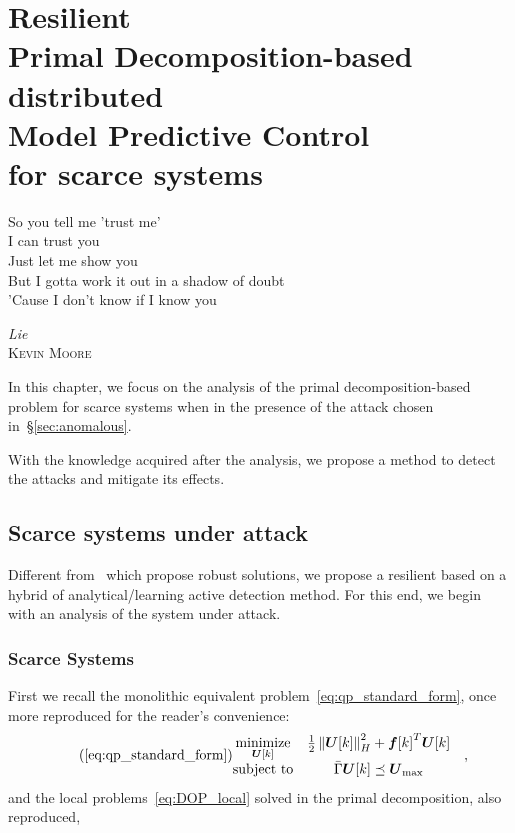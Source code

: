 \documentclass[../main.tex]{subfiles}
\begin{document}
\chapter[Resilient Primal Decomposition-based dMPC for scarce systems]{Resilient \\Primal Decomposition-based \\distributed \\Model Predictive Control\\ for scarce systems}\label{sec:safe_pddmpc_eq}
\epigraph{\centering So you tell me 'trust me' \\I can trust you\\ Just let me show you \\But I gotta work it out in a shadow of doubt \\'Cause I don't know if I know you}
{\textit{Lie}\\\textsc{Kevin Moore}}

In this chapter, we focus on the analysis of the primal decomposition-based \dmpc{} problem for scarce systems when in the presence of the attack chosen in~\S\ref{sec:anomalous}.

With the knowledge acquired after the analysis, we propose a method to detect the attacks and mitigate its effects.

\minitoc


\section{Scarce systems under attack}\label{sec:analys-scarce-syst}

Different from~\cite{VelardeEtAl2018,MaestreEtAl2021} which propose robust solutions, we propose a resilient \dmpc{} based on a hybrid of analytical/learning active detection method.
For this end, we begin with an analysis of the system under attack.

\subsection{Scarce Systems}\label{sec:scarce-systems}
First we recall the monolithic \mpc{} equivalent problem~\eqref{eq:qp_standard_form}, once more reproduced for the reader's convenience:
\begin{equation}
  \label{eq:qp_standard_form_again}
  \tag{\ref*{eq:qp_standard_form}}
  \begin{aligned}
    \begin{matrix}
      \underset{\vec{U}[k]}{\mathrm{minimize}} &
                                                 \frac{1}{2}\norm{\vec{U}[k]}^{2}_{H} + {\vec{f}[k]}^{T}\vec{U}[k] &\\
      \mathrm{subject~ to} &
                             \bar{\Gamma}\vec{U}[k]\preceq {\vec{U}}_{\text{max}}
    \end{matrix}
  \end{aligned},
\end{equation}
and the local problems~\eqref{eq:DOP_local} solved in the primal decomposition, also reproduced,
\end{document}
